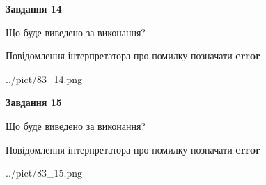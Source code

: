 \documentclass[11pt, ukrainian]{article}
\begin{document}
{\begin {large}
{\begin {center}\textbf{Завдання 14}\end {center}}\par
Що буде виведено за виконання? \par
Повідомлення інтерпретатора про помилку позначати \textbf{error}

\begin{center}
	{../pict/83_14.png}
\end{center}
\newpage

{\begin {center}\textbf{Завдання 15}\end {center}}\par
Що буде виведено за виконання? \par
Повідомлення інтерпретатора про помилку позначати \textbf{error}

\begin{center}
	{../pict/83_15.png}
\end{center}
\newpage

\end {large}}
\end{document}
